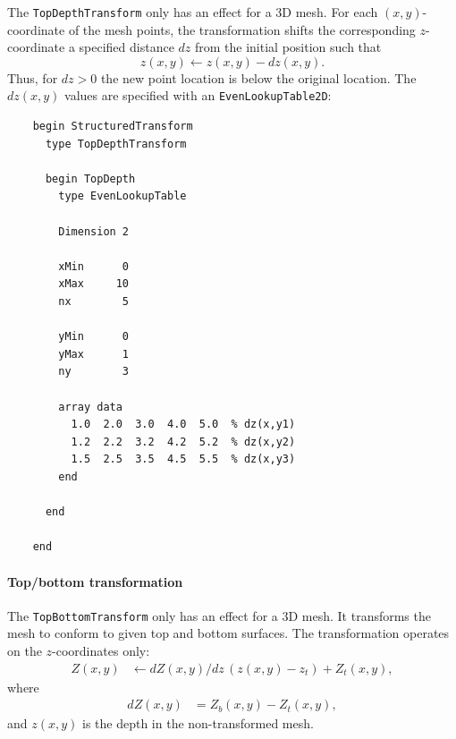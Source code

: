 The \texttt{TopDepthTransform} only has an effect for a 3D mesh. For each
$(x,y)$-coordinate of the mesh points, the transformation shifts the
corresponding $z$-coordinate a specified distance $dz$ from the
initial position such that
%
\begin{equation}
  \label{eq:1}
  z(x,y) \leftarrow z(x,y) - dz(x,y).  
\end{equation}
%
Thus, for $dz>0$ the new point location is below the original
location. The $dz(x,y)$ values are specified with an
\texttt{EvenLookupTable2D}:
% 
%
\begin{verbatim}
    begin StructuredTransform
      type TopDepthTransform

      begin TopDepth
        type EvenLookupTable

        Dimension 2

        xMin      0
        xMax     10
        nx        5
	      
        yMin      0
        yMax      1
        ny        3

        array data
          1.0  2.0  3.0  4.0  5.0  % dz(x,y1)
          1.2  2.2  3.2  4.2  5.2  % dz(x,y2)
          1.5  2.5  3.5  4.5  5.5  % dz(x,y3)
        end
        
      end

    end
\end{verbatim}
%


\paragraph{Top/bottom transformation}

The \texttt{TopBottomTransform} only has an effect for a 3D mesh. It
transforms the mesh to conform to given top and bottom surfaces. The
transformation operates on the $z$-coordinates only:
%
\begin{align}
  Z(x,y) & \leftarrow dZ(x,y)/dz \,(z(x,y)-z_t)+Z_t(x,y),
\end{align}
%
where
%
\begin{align}
  dZ(x,y) & = Z_b(x,y) - Z_t(x,y),
\end{align}
%
and $z(x,y)$ is the depth in the non-transformed mesh.


